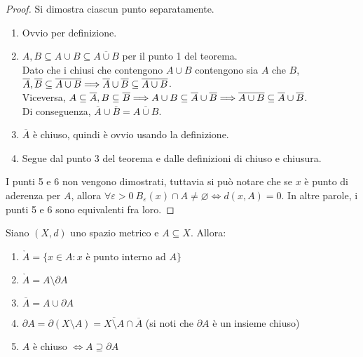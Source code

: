 \begin{proof} Si dimostra ciascun punto separatamente.
    \begin{enumerate}
        \item Ovvio per definizione.
        \item $A, B \subseteq A \cup B \subseteq \overline{A \cup B}$ per il punto 1 del teorema.\\
        Dato che i chiusi che contengono $A \cup B$ contengono sia $A$ che $B$, $\overline A, \overline B \subseteq \overline{A \cup B} \Longrightarrow \overline A \cup \overline B \subseteq \overline{A \cup B}$.\\
        Viceversa, $A \subseteq \overline{A}, B \subseteq \overline{B} \Longrightarrow A \cup B \subseteq \overline{A} \cup \overline{B} \Longrightarrow \overline{A \cup B} \subseteq \overline{A} \cup \overline{B}$.\\
        Di conseguenza, $\overline{A} \cup \overline{B} = \overline{A \cup B}$.
        \item $\overline{A}$ è chiuso, quindi è ovvio usando la definizione.
        \item Segue dal punto 3 del teorema e dalle definizioni di chiuso e chiusura.
    \end{enumerate}
    I punti 5 e 6 non vengono dimostrati, tuttavia si può notare che se $x$ è punto di aderenza per $A$, allora $\forall \varepsilon > 0 \ B_\varepsilon(x) \cap A \neq \varnothing \iff d(x,A)=0$. In altre parole, i punti 5 e 6 sono equivalenti fra loro.
\end{proof}

\begin{theorem}
    Siano $(X,d)$ uno spazio metrico e $A \subseteq X$. Allora:
    \begin{enumerate}
        \item $\mathring A = \{x \in A : x \text{ è punto interno ad }A\}$
        \item $\mathring A = A \setminus \partial A$
        \item $\overline{A} = A \cup \partial A$
        \item $\partial A = \partial (X\setminus A)= \overline{X\setminus A}\cap\overline{A}$ (si noti che $\partial A$ è un insieme chiuso)
        \item $A$ è chiuso $\iff A \supseteq \partial A$
    \end{enumerate}
\end{theorem}

